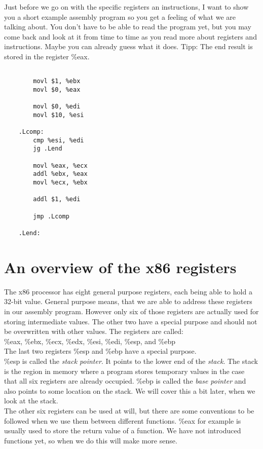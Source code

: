 \documentclass{scrreprt}
\begin{document}
Just before we go on with the specific registers an instructions, I want to show you a short example assembly program so you get a feeling of what we are talking about. You don't have to be able to read the program yet, but you may come back and look at it from time to time as you read more about registers and instructions. Maybe you can already guess what it does. Tipp: The end result is stored in the register \%eax.



\begin{lstlisting}

		movl $1, %ebx
		movl $0, %eax

		movl $0, %edi
		movl $10, %esi

	.Lcomp:
		cmp %esi, %edi
		jg .Lend

		movl %eax, %ecx
		addl %ebx, %eax
		movl %ecx, %ebx

		addl $1, %edi

		jmp .Lcomp

	.Lend:

\end{lstlisting}


\section{An overview of the x86 registers}
The x86 processor has eight general purpose registers, each being able to hold a 32-bit value. General purpose means, that we are able to address these registers in our assembly program. However only six of those registers are actually used for storing intermediate values. The other two have a special purpose and should not be overwritten with other values. The registers are called: \\
\%eax, \%ebx, \%ecx, \%edx, \%esi, \%edi, \%esp, and \%ebp \\
The last two registers \%esp and \%ebp have a special purpose. \\
\%esp is called the \textit{stack pointer}. It points to the lower end of the \textit{stack}. The stack is the region in memory where a program stores temporary values in the case that all six registers are already occupied. \%ebp is called the \textit{base pointer} and also points to some location on the stack. We will cover this a bit later, when we look at the stack. \\
The other six registers can be used at will, but there are some conventions to be followed when we use them between different functions. \%eax for example is usually used to store the return value of a function. We have not introduced functions yet, so when we do this will make more sense.
\end{document}

